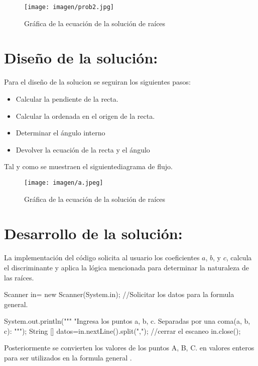 \documentclass{IEEEcsmag}
\begin{document}
\begin{figure}[h!]
    \centering
    \texttt{[image: imagen/prob2.jpg]}
    \caption{Gráfica de la ecuación de la solución de raíces}
    \label{fig:GraficaEcuacionRecta}
\end{figure}

\section*{Diseño de la solución:}

Para el diseño de la solucion se seguiran los siguientes pasos:
\begin{itemize}
    \item Calcular la pendiente de la recta.
    \item Calcular la ordenada en el origen de la recta.
    \item Determinar el ángulo interno
    \item Devolver la ecuación de la recta y el ángulo
\end{itemize}

Tal y como se muestraen el siguientediagrama de flujo.

\begin{figure}[h!]
    \centering
    \texttt{[image: imagen/a.jpeg]}
    \caption{Gráfica de la ecuación de la solución de raíces}
    \label{fig:GraficaEcuacionRecta}
\end{figure}

\section*{Desarrollo de la solución:}
La implementación del código solicita al usuario los coeficientes \(a\), \(b\), y \(c\), calcula el discriminante y aplica la lógica mencionada para determinar la naturaleza de las raíces. 
\begin{javaCode}
 Scanner in= new Scanner(System.in);
        //Solicitar los datos para la formula general.
        
        System.out.println("""
                           "Ingresa los puntos a, b, c.
                           Separadas por una coma(a, b, c): 
                           """);
        String [] datos=in.nextLine().split(",");
        //cerrar el escaneo
        in.close();
        
\end{javaCode}
\newpage
Posteriormente se convierten los valores de los puntos A, B, C. en valores enteros para ser utilizados  en la formula general .
\end{document}
